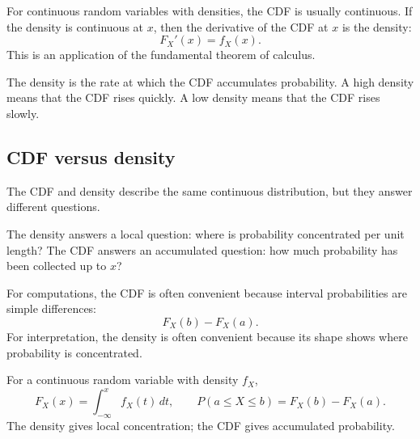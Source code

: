 For continuous random variables with densities, the CDF is usually continuous.
If the density is continuous at \(x\), then the derivative of the CDF at \(x\) is
the density:
\[
F_X'(x)=f_X(x).
\]
This is an application of the fundamental theorem of calculus.

\begin{remarkbox}
The density is the rate at which the CDF accumulates probability. A high density
means that the CDF rises quickly. A low density means that the CDF rises slowly.
\end{remarkbox}

\subsection*{CDF versus density}

The CDF and density describe the same continuous distribution, but they answer
different questions.

The density answers a local question: where is probability concentrated per unit
length? The CDF answers an accumulated question: how much probability has been
collected up to \(x\)?

For computations, the CDF is often convenient because interval probabilities are
simple differences:
\[
F_X(b)-F_X(a).
\]
For interpretation, the density is often convenient because its shape shows where
probability is concentrated.

\begin{summarybox}
For a continuous random variable with density \(f_X\),
\[
F_X(x)=\int_{-\infty}^{x}f_X(t)\,dt,
\qquad
P(a\leq X\leq b)=F_X(b)-F_X(a).
\]
The density gives local concentration; the CDF gives accumulated probability.
\end{summarybox}
